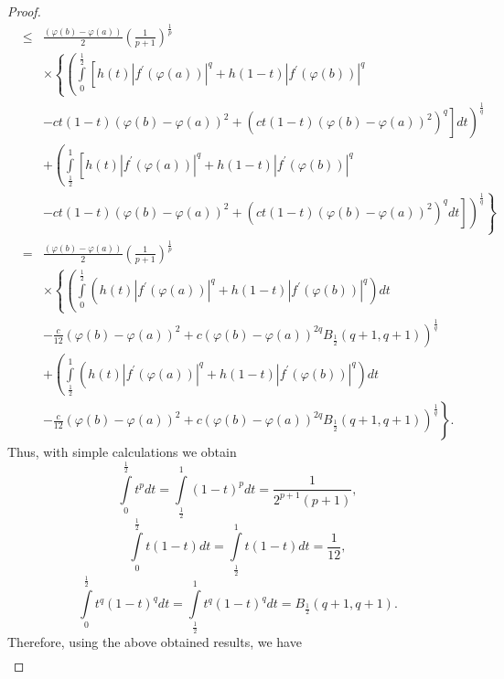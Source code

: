 \documentclass{amsart}
\theoremstyle{plain}
\numberwithin{equation}{section}
\begin{document}
\begin{proof}
\begin{eqnarray*}
&\leq &\frac{(\varphi (b)-\varphi (a))}{2}\left( \frac{1}{p+1}\right) ^{\frac{1}{p}} \\
&&\times \left\{ \left( \int\limits_{0}^{\frac{1}{2}}\left[ h(t)\left\vert
f^{\prime }(\varphi (a))\right\vert ^{q}+h(1-t)\left\vert f^{\prime
}(\varphi (b))\right\vert ^{q}\right. \right. \right.  \\
&&\left. \left. -ct(1-t)(\varphi (b)-\varphi (a))^{2}+\left( ct(1-t)(\varphi
(b)-\varphi (a))^{2}\right) ^{q}\right] dt\right) ^{\frac{1}{q}} \\
&&+\left( \int\limits_{\frac{1}{2}}^{1}\left[ h(t)\left\vert f^{\prime
}(\varphi (a))\right\vert ^{q}+h(1-t)\left\vert f^{\prime }(\varphi
(b))\right\vert ^{q}\right. \right.  \\
&&-\left. \left. \left. ct(1-t)(\varphi (b)-\varphi (a))^{2}+\left(
ct(1-t)(\varphi (b)-\varphi (a))^{2}\right) ^{q}dt\right] \right) ^{\frac{1}{q}}\right\}  \\
&=&\frac{(\varphi (b)-\varphi (a))}{2}\left( \frac{1}{p+1}\right) ^{\frac{1}{p}} \\
&&\times \left\{ \left( \int\limits_{0}^{\frac{1}{2}}\left( h(t)\left\vert
f^{\prime }(\varphi (a))\right\vert ^{q}+h(1-t)\left\vert f^{\prime
}(\varphi (b))\right\vert ^{q}\right) dt\right. \right.  \\
&&\left. -\frac{c}{12}(\varphi (b)-\varphi (a))^{2}+c(\varphi (b)-\varphi
(a))^{2q}B_{\frac{1}{2}}(q+1,q+1)\right) ^{\frac{1}{q}} \\
&&+\left( \int\limits_{\frac{1}{2}}^{1}\left( h(t)\left\vert f^{\prime
}(\varphi (a))\right\vert ^{q}+h(1-t)\left\vert f^{\prime }(\varphi
(b))\right\vert ^{q}\right) dt\right.  \\
&&-\left. \left. \frac{c}{12}(\varphi (b)-\varphi (a))^{2}+c(\varphi
(b)-\varphi (a))^{2q}B_{\frac{1}{2}}(q+1,q+1)\right) ^{\frac{1}{q}}\right\} .
\end{eqnarray*}Thus, with simple calculations we obtain\begin{equation*}
\int\limits_{0}^{\frac{1}{2}}t^{p}dt=\int\limits_{\frac{1}{2}}^{1}\left(
1-t\right) ^{p}dt=\frac{1}{2^{p+1}\left( p+1\right) },
\end{equation*}\begin{equation*}
\int\limits_{0}^{\frac{1}{2}}t(1-t)dt=\int\limits_{\frac{1}{2}}^{1}t(1-t)dt=\frac{1}{12},
\end{equation*}\begin{equation*}
\int\limits_{0}^{\frac{1}{2}}t^{q}(1-t)^{q}dt=\int\limits_{\frac{1}{2}}^{1}t^{q}(1-t)^{q}dt=B_{\frac{1}{2}}(q+1,q+1).
\end{equation*}Therefore, using the above obtained results, we have\begin{eqnarray*}

\end{eqnarray*}
\end{proof}
\end{document}
